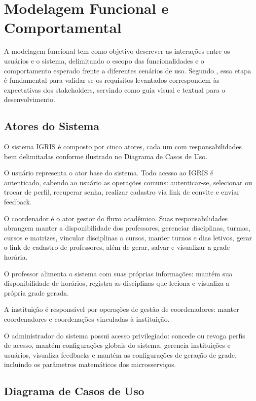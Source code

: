 \section{Modelagem Funcional e Comportamental}
\label{sec:4.2}

A modelagem funcional tem como objetivo descrever as interações entre os usuários e o sistema, delimitando o escopo das funcionalidades e o comportamento esperado frente a diferentes cenários de uso. Segundo , essa etapa é fundamental para validar se os requisitos levantados correspondem às expectativas dos stakeholders, servindo como guia visual e textual para o desenvolvimento.

\subsection{Atores do Sistema}
\label{subsec:4.2.1}

O sistema IGRIS é composto por cinco atores, cada um com responsabilidades bem delimitadas conforme ilustrado no Diagrama de Casos de Uso.

O usuário representa o ator base do sistema. Todo acesso ao IGRIS é autenticado, cabendo ao usuário as operações comuns: autenticar-se, selecionar ou trocar de perfil, recuperar senha, realizar cadastro via link de convite e enviar feedback.

O coordenador é o ator gestor do fluxo acadêmico. Suas responsabilidades abrangem manter a disponibilidade dos professores, gerenciar disciplinas, turmas, cursos e matrizes, vincular disciplinas a cursos, manter turnos e dias letivos, gerar o link de cadastro de professores, além de gerar, salvar e visualizar a grade horária.

O professor alimenta o sistema com suas próprias informações: mantém sua disponibilidade de horários, registra as disciplinas que leciona e visualiza a própria grade gerada.

A instituição é responsável por operações de gestão de coordenadores: manter coordenadores e coordenações vinculadas à instituição.

O administrador do sistema possui acesso privilegiado: concede ou revoga perfis de acesso, mantém configurações globais do sistema, gerencia instituições e usuários, visualiza feedbacks e mantém as configurações de geração de grade, incluindo os parâmetros matemáticos dos microsserviços.

\subsection{Diagrama de Casos de Uso}
\label{subsec:4.2.2}

